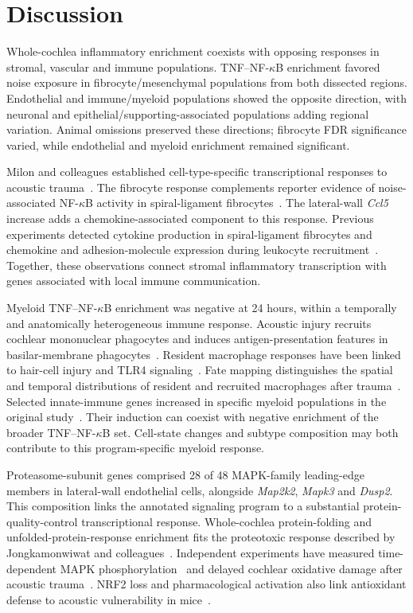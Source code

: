 \section{Discussion}

Whole-cochlea inflammatory enrichment coexists with opposing responses in stromal, vascular and immune populations. TNF--NF-\(\kappa\)B enrichment favored noise exposure in fibrocyte/\allowbreak{}mesenchymal populations from both dissected regions. Endothelial and immune/\allowbreak{}myeloid populations showed the opposite direction, with neuronal and epithelial/\allowbreak{}supporting-associated populations adding regional variation. Animal omissions preserved these directions; fibrocyte FDR significance varied, while endothelial and myeloid enrichment remained significant.

Milon and colleagues established cell-type-specific transcriptional responses to acoustic trauma~\citep{Milon2021}. The fibrocyte response complements reporter evidence of noise-associated NF-\(\kappa\)B activity in spiral-ligament fibrocytes~\citep{Adams2009,Herranen2018}. The lateral-wall \mbox{\textit{Ccl5}} increase adds a chemokine-associated component to this response. Previous experiments detected cytokine production in spiral-ligament fibrocytes and chemokine and adhesion-molecule expression during leukocyte recruitment~\citep{Fujioka2006,Tornabene2006}. Together, these observations connect stromal inflammatory transcription with genes associated with local immune communication.

Myeloid TNF--NF-\(\kappa\)B enrichment was negative at 24 hours, within a temporally and anatomically heterogeneous immune response. Acoustic injury recruits cochlear mononuclear phagocytes and induces antigen-presentation features in basilar-membrane phagocytes~\citep{Hirose2005,Yang2015}. Resident macrophage responses have been linked to hair-cell injury and TLR4 signaling~\citep{Pan2024}. Fate mapping distinguishes the spatial and temporal distributions of resident and recruited macrophages after trauma~\citep{Murali2025}. Selected innate-immune genes increased in specific myeloid populations in the original study~\citep{Milon2021}. Their induction can coexist with negative enrichment of the broader TNF--NF-\(\kappa\)B set. Cell-state changes and subtype composition may both contribute to this program-specific myeloid response.

Proteasome-subunit genes comprised 28 of 48 MAPK-family leading-edge members in lateral-wall endothelial cells, alongside \mbox{\textit{Map2k2}}, \mbox{\textit{Mapk3}} and \mbox{\textit{Dusp2}}. This composition links the annotated signaling program to a substantial protein-quality-control transcriptional response. Whole-cochlea protein-folding and unfolded-protein-response enrichment fits the proteotoxic response described by Jongkamonwiwat and colleagues~\citep{Jongkamonwiwat2020}. Independent experiments have measured time-dependent MAPK phosphorylation~\citep{Maeda2013} and delayed cochlear oxidative damage after acoustic trauma~\citep{Yamashita2004}. NRF2 loss and pharmacological activation also link antioxidant defense to acoustic vulnerability in mice~\citep{Honkura2016}.

